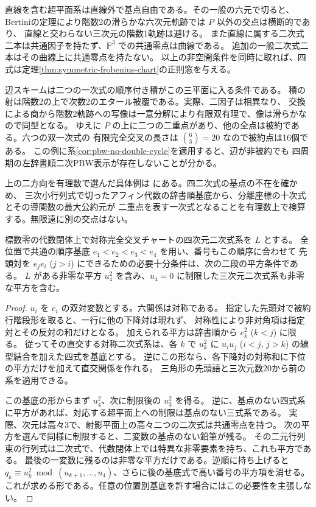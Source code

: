 直線を含む超平面系は直線外で基点自由である。その一般の六元で切ると、
Bertiniの定理により階数2の滑らかな六次元軌跡では $P$ 以外の交点は横断的であり、
直線と交わらない三次元の階数1軌跡は避ける。
また直線に属する二次式二本は共通因子を持たず、$\mathbb P^3$ での共通零点は曲線である。
追加の一般二次式二本はその曲線上に共通零点を持たない。
以上の非空開条件を同時に取れば、四式は定理\ref{thm:symmetric-frobenius-chart}の正則窓を与える。

辺スキームは二つの一次式の順序付き積がこの三平面に入る条件である。
積の射は階数2の上で次数2のエタール被覆である。実際、二因子は相異なり、
交換による商から階数2軌跡への写像は一意分解により有限双有理で、像は滑らかなので同型となる。
ゆえに $P$ の上に二つの二重点があり、他の全点は被約である。六つの双一次式の
有限完全交叉の長さは $\binom63=20$ なので被約点は16個である。
この例に系\ref{cor:pbw-no-double-cycle}を適用すると、辺が非被約でも
四周期の左辞書順二次PBW表示が存在しないことが分かる。

上の二方向を有理数で選んだ具体例は
にある。四二次式の基点の不在を確かめ、
三次小行列式で切ったアフィン代数の辞書順基底から、分離座標の十次式とその導関数の最大公約元が
二重点を表す一次式となることを有理数上で検算する。無限遠に別の交点はない。

\begin{proposition}\label{prop:pbw-symmetric-square-flag}
標数零の代数閉体上で対称完全交叉チャートの四次元二次式系を $L$ とする。
全位置で共通の順序基底 $e_1<e_2<e_3<e_4$ を用い、番号もこの順序に合わせて
先頭対を $e_j e_i$ ($j>i$) にできるための必要十分条件は、次の二段の平方条件である。
$L$ がある非零な平方 $u_4^2$ を含み、$u_4=0$ に制限した三次元二次式系も非零な平方を含む。
\end{proposition}
\begin{proof}
$u_i$ を $e_i$ の双対変数とする。六関係は対称である。
指定した先頭対で被約行階段形を取ると、一行に他の下降対は現れず、
対称性により非対角項は指定対とその反対の和だけとなる。
加えられる平方は辞書順から $e_k^2$ ($k<j$) に限る。
従ってその直交する対称二次式系は、各 $k$ で
$u_k^2$ に $u_i u_j$ ($i<j$, $j>k$) の線型結合を加えた四式を基底とする。
逆にこの形なら、各下降対の対称和に下位の平方だけを加えて直交関係を作れる。
三角形の先頭語と三次元数20から前の系を適用できる。

この基底の形からまず $u_4^2$、次に制限後の $u_3^2$ を得る。
逆に、基点のない四式系に平方があれば、対応する超平面上への制限は基点のない三式系である。
実際、次元は高々3で、射影平面上の高々二つの二次式は共通零点を持つ。
次の平方を選んで同様に制限すると、二変数の基点のない鉛筆が残る。
その二元行列束の行列式は二次式で、代数閉体上では特異な非零要素を持ち、これも平方である。
最後の一変数に残るのは非零な平方だけである。逆順に持ち上げると
$q_k\equiv u_k^2\bmod(u_{k+1},\ldots,u_4)$、さらに後の基底式で高い番号の平方項を消せる。
これが求める形である。任意の位置別基底を許す場合にはこの必要性を主張しない。
\end{proof}

